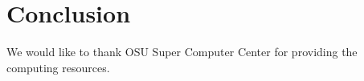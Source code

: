 \chapter{Conclusion}

We would like to thank OSU Super Computer Center \cite{Oakley2012} for providing the computing resources.



\endinput